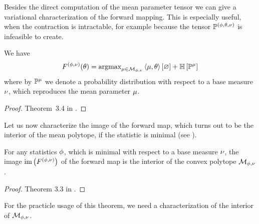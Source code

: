 
Besides the direct computation of the mean parameter tensor we can give a variational characterization of the forward mapping.
This is especially useful, when the contraction is intractable, for example because the tensor $\mathbb{P}^{(\phi,\theta,\nu)}$ is infeasible to create.

\begin{theorem}
	We have
	\begin{align*}
		F^{(\phi,\nu)}(\theta)
		  = \mathrm{argmax}_{\mu\in\mathcal{M}_{\phi,\nu}}  \left\langle \mu,\theta\right\rangle \left[ \varnothing \right] + \mathbb{H}\left[\mathbb{P}^{\mu}\right] 
	\end{align*}
	where by $\mathbb{P}^{\mu}$ we denote a probability distribution with respect to a base measure $\nu$, which reproduces the mean parameter $\mu$.
\end{theorem}
\begin{proof}
	Theorem~3.4 in \cite{wainwright_graphical_2008}.
\end{proof}

Let us now characterize the image of the forward map, which turns out to be the interior of the mean polytope, if the statistic is minimal (see ).

\begin{theorem}\label{the:meanPolytopeInterior}
	For any statistics $\phi$, which is minimal with respect to a base measure $\nu$, the image $\mathrm{im}\left(F^{(\phi,\nu)}\right)$ of the forward map is the interior of the convex polytope $\mathcal{M}_{\phi,\nu}$.
\end{theorem}
\begin{proof}
	Theorem 3.3 in \cite{wainwright_graphical_2008}.
\end{proof}

For the practicle usage of this theorem, we need a characterization of the interior of $\mathcal{M}_{\phi,\nu}$.

